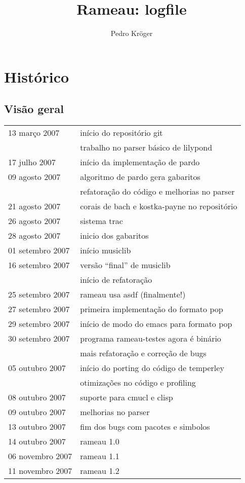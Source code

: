 \documentclass[12pt,brazil]{book}
\title{Rameau: logfile}
\author{Pedro Kröger}
\begin{document}
\graphicspath{{figs/}}

\maketitle

\chapter{Histórico}
\label{cha:historico}

\section{Visão geral}
\label{sec:visao-geral}

\begin{tabular}{ll}
  13 março 2007  & início do repositório git \\
                 & trabalho no parser básico de lilypond \\
  17 julho 2007  & início da implementação de pardo \\
  09 agosto 2007 & algoritmo de pardo gera gabaritos \\
                 & refatoração do código e melhorias no parser \\
  21 agosto 2007 & corais de bach e kostka-payne no repositório \\
  26 agosto 2007 & sistema trac \\
  28 agosto 2007 & inicio dos gabaritos \\
  01 setembro 2007 & início musiclib \\
  16 setembro 2007 & versão ``final'' de musiclib \\
                   & início de refatoração \\
  25 setembro 2007 & rameau usa asdf (finalmente!) \\
  27 setembro 2007 & primeira implementação do formato pop \\
  29 setembro 2007 & início de modo do emacs para formato pop \\
  30 setembro 2007 & programa rameau-testes agora é binário \\
                   & mais refatoração e correção de bugs \\
  05 outubro 2007  & início do porting do código de temperley \\
                   & otimizações no código e profiling \\
  08 outubro 2007  & suporte para cmucl e clisp \\
  09 outubro 2007  & melhorias no parser \\
  13 outubro 2007  & fim dos bugs com pacotes e simbolos \\
  14 outubro 2007  & rameau 1.0 \\
  06 novembro 2007 & rameau 1.1 \\
  11 novembro 2007 & rameau 1.2 \\
\end{tabular}
\end{document}
